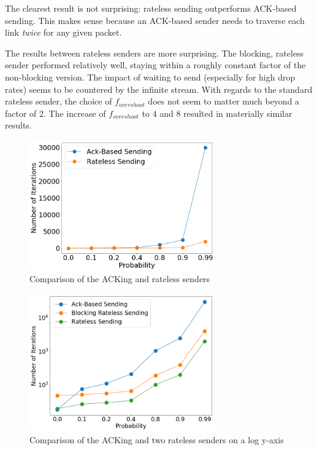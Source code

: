The clearest result is not surprising: rateless sending outperforms ACK-based sending. This makes sense because an ACK-based sender needs to traverse each link \textit{twice} for any given packet. 

The results between rateless senders are more surprising. The blocking, rateless sender performed relatively well, staying within a roughly constant factor of the non-blocking version. The impact of waiting to send (especially for high drop rates) seems to be countered by the infinite stream. With regards to the standard rateless sender, the choice of $f_{overshoot}$ does not seem to matter much beyond a factor of $2$. The increase of $f_{overshoot}$ to $4$ and $8$ resulted in materially similar results.

\begin{figure}[tp]
\centering
\noindent
\includegraphics[width=8cm]{figures/ACK_RATELESS_FINAL.png}
\caption{Comparison of the ACKing and rateless senders}
\label{graph:ackvsrateless}
\end{figure}

\begin{figure}[tp]
\centering
\noindent
\includegraphics[width=8cm]{figures/TRIPLE_FINAL.png}
\caption{Comparison of the ACKing and two rateless senders on a log y-axis}
\label{graph:ackvsratelessLOG}
\end{figure}

